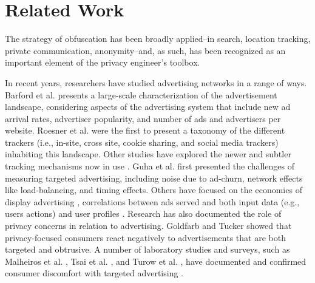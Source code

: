 \documentclass[conference]{IEEEtran}
\begin{document}
\section{Related Work}

The strategy of obfuscation has been broadly applied--in search, location tracking, private communication, anonymity--and, as such, has been recognized as an important element of the privacy engineer's toolbox.

In recent years, researchers have studied advertising networks in a range of ways. Barford et al. \cite{Barford} presents a large-scale characterization of the advertisement landscape, considering aspects of the advertising system that include new ad arrival rates, advertiser popularity, and number of ads and advertisers per website. Roesner et al. \cite{Roesner} were the first to present a taxonomy of the different trackers (i.e., in-site, cross site, cookie sharing, and social media trackers) inhabiting this landscape. Other studies have explored the newer and subtler tracking mechanisms now in use \cite{Acar,Gomer,Vallina}. Guha et al. \cite{Guha} first presented the challenges of measuring targeted advertising, including noise due to ad-churn, network effects like load-balancing, and timing effects. Others have focused on the economics of display advertising \cite{Gill}, correlations between ads served and both input data (e.g., users actions) and user profiles \cite{Lecuyer, Castelluccia}. Research has also documented the role of privacy concerns in relation to advertising. Goldfarb and Tucker \cite{Goldfarb} showed that privacy-focused consumers react negatively to advertisements that are both targeted and obtrusive. A number of laboratory studies and surveys, such as Malheiros et al. \cite{Malheiros}, Tsai et al. \cite{Tsai}, and Turow et al. \cite{Turow}, have documented and confirmed consumer discomfort with targeted advertising \cite{Tucker}.
\end{document}
